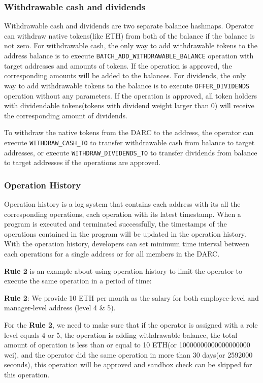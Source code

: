 \documentclass[main.tex]{subfiles}
\begin{document}
\subsubsection{Withdrawable cash and dividends}

Withdrawable cash and dividends are two separate balance hashmaps. Operator can withdraw native tokens(like ETH) from both of the balance if the balance is not zero. For withdrawable cash, the only way to add withdrawable tokens to the address balance is to execute \texttt{BATCH\_ADD\_WITHDRAWABLE\_BALANCE} operation with target addresses and amounts of tokens. If the operation is approved, the corresponding amounts will be added to the balances. For dividends, the only way to add withdrawable tokens to the balance is to execute \texttt{OFFER\_DIVIDENDS} operation without any parameters. If the operation is approved, all token holders with dividendable tokens(tokens with dividend weight larger than 0) will receive the corresponding amount of dividends.

To withdraw the native tokens from the DARC to the address, the operator can execute \texttt{WITHDRAW\_CASH\_TO} to transfer withdrawable cash from balance to target addresses, or execute \texttt{WITHDRAW\_DIVIDENDS\_TO} to transfer dividends from balance to target addresses if the operations are approved.

\subsubsection{Operation History}

Operation history is a log system that contains each address with its all the corresponding operations, each operation with its latest timestamp. When a program is executed and terminated successfully, the timestamps of the operations contained in the program will be updated in the operation history. With the operation history, developers can set minimum time interval between each operations for a single address or for all members in the DARC.

\textbf{Rule 2} is an example about using operation history to limit the operator to execute the same operation in a period of time:

\textbf{Rule 2}: We provide 10 ETH per month as the salary for both employee-level and manager-level address (level 4 \& 5).


For the \textbf{Rule 2}, we need to make sure that if the operator is assigned with a role level equals 4 or 5, the operation is adding withdrawable balance, the total amount of operation is less than or equal to 10 ETH(or 10000000000000000000 wei), and the operator did the same operation in more than 30 days(or 2592000 seconds), this operation will be approved and sandbox check can be skipped for this operation.
\end{document}
